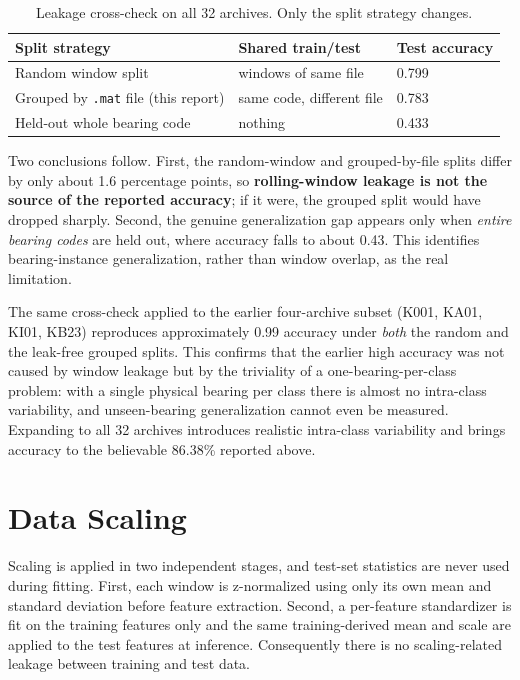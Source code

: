 \documentclass[11pt,a4paper]{article}
\begin{document}
\begin{table}[H]
\centering
\caption{Leakage cross-check on all 32 archives. Only the split strategy changes.}
\label{tab:leakage}
\begin{tabular}{lll}
\toprule
\textbf{Split strategy} & \textbf{Shared train/test} & \textbf{Test accuracy} \\
\midrule
Random window split & windows of same file & 0.799 \\
Grouped by \texttt{.mat} file (this report) & same code, different file & 0.783 \\
Held-out whole bearing code & nothing & 0.433 \\
\bottomrule
\end{tabular}
\end{table}

Two conclusions follow. First, the random-window and grouped-by-file splits differ by only
about 1.6 percentage points, so \textbf{rolling-window leakage is not the source of the reported
accuracy}; if it were, the grouped split would have dropped sharply. Second, the genuine
generalization gap appears only when \emph{entire bearing codes} are held out, where accuracy
falls to about 0.43. This identifies bearing-instance generalization, rather than window
overlap, as the real limitation.

The same cross-check applied to the earlier four-archive subset (K001, KA01, KI01, KB23)
reproduces approximately 0.99 accuracy under \emph{both} the random and the leak-free grouped
splits. This confirms that the earlier high accuracy was not caused by window leakage but by the
triviality of a one-bearing-per-class problem: with a single physical bearing per class there is
almost no intra-class variability, and unseen-bearing generalization cannot even be measured.
Expanding to all 32 archives introduces realistic intra-class variability and brings accuracy to
the believable 86.38\% reported above.

\section{Data Scaling}
Scaling is applied in two independent stages, and test-set statistics are never used during
fitting. First, each window is z-normalized using only its own mean and standard deviation
before feature extraction. Second, a per-feature standardizer is fit on the training features
only and the same training-derived mean and scale are applied to the test features at inference.
Consequently there is no scaling-related leakage between training and test data.
\end{document}
